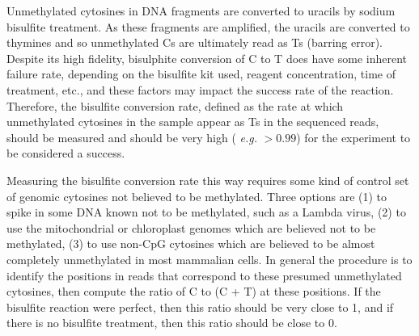 \documentclass[10pt]{article}
\begin{document}
Unmethylated cytosines in DNA fragments are converted to uracils by
sodium bisulfite treatment. As these fragments are amplified, the
uracils are converted to thymines and so unmethylated Cs are
ultimately read as Ts (barring error). Despite its high fidelity,
bisulphite conversion of C to T does have some inherent failure rate,
depending on the bisulfite kit used, reagent concentration, time of
treatment, etc., and these factors may impact the success rate of the
reaction. Therefore, the bisulfite conversion rate, defined as the
rate at which unmethylated cytosines in the sample appear as Ts in the
sequenced reads, should be measured and should be very high ({\em
  e.g.} $>0.99$) for the experiment to be considered a success.

Measuring the bisulfite conversion rate this way requires some kind of
control set of genomic cytosines not believed to be methylated. Three
options are (1) to spike in some DNA known not to be methylated, such
as a Lambda virus, (2) to use the mitochondrial or chloroplast genomes
which are believed not to be methylated, (3) to use non-CpG cytosines
which are believed to be almost completely unmethylated in most
mammalian cells. In general the procedure is to identify the positions
in reads that correspond to these presumed unmethylated cytosines,
then compute the ratio of C to (C + T) at these positions. If the
bisulfite reaction were perfect, then this ratio should be very close
to 1, and if there is no bisulfite treatment, then this ratio should
be close to 0.
\end{document}
